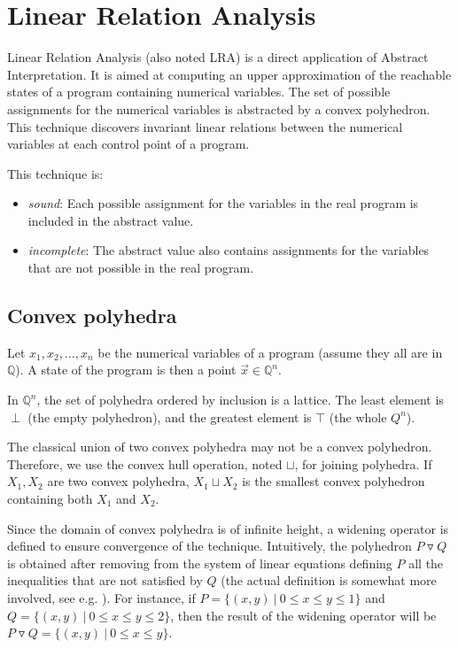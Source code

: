 \documentclass[a4paper,english,titlepage,11pt]{report}
\def\Q{\mathbb{Q}}
\newcommand{\widening}{\mathop{\triangledown}}
\begin{document}
\section{Linear Relation Analysis}

Linear Relation Analysis \cite{CH78} (also noted LRA) is a direct application of
Abstract Interpretation. It is aimed at computing an upper approximation of the
reachable states of a program containing numerical variables. The set of
possible assignments for the numerical variables is abstracted by a convex
polyhedron. This technique discovers invariant linear relations between
the numerical variables at each control point of a program.

This technique is:
\begin{itemize}
\item \emph{sound}: Each possible assignment for the variables in the real
program is included in the abstract value.
\item \emph{incomplete}: The abstract value also contains assignments for the
variables that are not possible in the real program.
\end{itemize}

\subsection{Convex polyhedra}

Let $x_1, x_2, \dots ,x_n$ be the numerical variables of a program (assume they
all are in $\Q$). A state of
the program is then a point $\overrightarrow{x} \in \Q^n$.

In $\Q^n$, the set of polyhedra ordered by inclusion is a lattice. The least element is $\perp$
(the empty polyhedron), and the greatest element is $\top$ (the whole $Q^n$).

The classical union of two convex polyhedra may not be a convex polyhedron.
Therefore, we use the convex hull operation, noted $\sqcup$, for joining
polyhedra. 
If $X_1, X_2$ are two convex polyhedra, $X_1 \sqcup X_2$ is the
smallest convex polyhedron containing both $X_1$ and $X_2$.

Since the domain of convex polyhedra is of infinite height, a widening operator
is defined to ensure convergence of the technique. 
Intuitively, the polyhedron $P \widening Q$ is obtained after 
removing from the system of linear equations defining $P$ all the inequalities
that are not satisfied by $Q$ (the actual definition is somewhat more involved,
see e.g. \cite{BagnaraHRZ05SCP}).
For instance, if $P = \{(x,y)\ |\ 0 \leq x \leq y \leq 1 \}$ and $Q = 
\{(x,y)\ |\ 0 \leq x \leq y \leq 2 \}$, then the result of the widening operator
will be $P \widening Q = \{(x,y)\ |\ 0 \leq x \leq y \}$.
\end{document}
